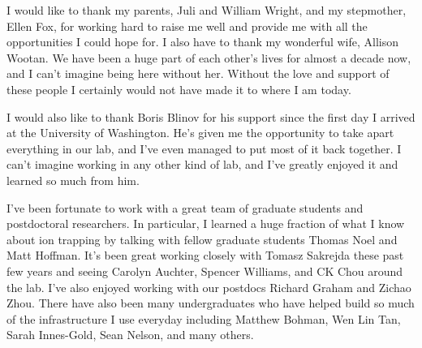 I would like to thank my parents, Juli and William Wright, and my stepmother, Ellen Fox, for working hard to raise me well and provide me with all the opportunities I could hope for.  I also have to thank my wonderful wife, Allison Wootan.  We have been a huge part of each other's lives for almost a decade now, and I can't imagine being here without her.  Without the love and support of these people I certainly would not have made it to where I am today.

I would also like to thank Boris Blinov for his support since the first day I arrived at the University of Washington.  He's given me the opportunity to take apart everything in our lab, and I've even managed to put most of it back together.  I can't imagine working in any other kind of lab, and I've greatly enjoyed it and learned so much from him.

I've been fortunate to work with a great team of graduate students and postdoctoral researchers.  In particular, I learned a huge fraction of what I know about ion trapping by talking with fellow graduate students Thomas Noel and Matt Hoffman.  It's been great working closely with Tomasz Sakrejda these past few years and seeing Carolyn Auchter, Spencer Williams, and CK Chou around the lab.  I've also enjoyed working with our postdocs Richard Graham and Zichao Zhou.  There have also been many undergraduates who have helped build so much of the infrastructure I use everyday including Matthew Bohman, Wen Lin Tan, Sarah Innes-Gold, Sean Nelson, and many others.
